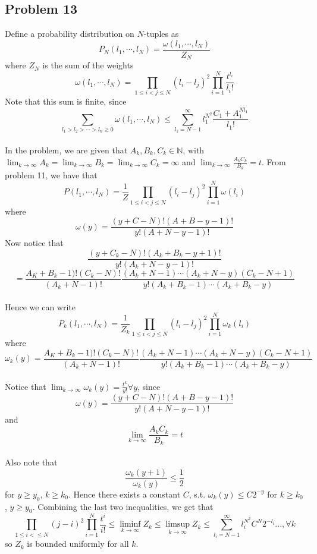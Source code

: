\documentclass[12pt]{article}
\begin{document}
	
	\subsection*{Problem 13}

Define a probability distribution on $N$-tuples as
$$P_N(l_1, \cdots, l_N) = \frac{\omega(l_1, \cdots, l_N)}{Z_N}$$
where $Z_N$ is the sum of the weights
$$\omega(l_1, \cdots, l_N) = \prod_{1 \leq i < j \leq N} (l_i - l_j)^2 \prod_{i = 1}^N \frac{t^{l_i}}{l_i !}$$
Note that this sum is finite, since
$$\sum_{l_1 > l_2 > \cdots > l_n \geq 0} \omega(l_1, \cdots, l_N) \leq \sum_{l_1 = N-1}^\infty l_1^{N^2} \frac{C_1 + A_1^{Nl_1}}{l_1!}$$\\

In the problem, we are given that $A_k, B_k, C_k \in \mathbb{N}$, with $\lim_{k \rightarrow \infty} A_k = \lim_{k \rightarrow \infty} B_k = \lim_{k \rightarrow \infty} C_k = \infty$ and $\lim_{k \rightarrow \infty} \frac{A_k C_k}{B_k} = t$. From problem 11, we have that
$$P(l_1, \cdots, l_N) = \frac{1}{Z} \prod_{1 \leq i < j \leq N} (l_i - l_j)^2 \prod_{i = 1}^N \omega(l_i)$$
where
$$\omega(y) = \frac{(y + C - N)!(A + B - y - 1)!}{y!(A + N - y - 1)!}$$
Now notice that
$$\frac{(y + C_k - N) ! (A_k + B_k - y + 1)!}{y! (A_k + N - y - 1)!}$$
$$= \frac{A_K + B_k - 1)! (C_k - N)!}{(A_k + N - 1)!} \frac{(A_k + N - 1) \cdots (A_k + N - y) (C_k - N + 1)}{y! (A_k + B_k - 1) \cdots (A_k + B_k - y)}$$\\

Hence we can write
$$P_k(l_1, \cdots, l_N) = \frac{1}{Z_k} \prod_{1 \leq i < j \leq N}(l_i - l_j)^2 \prod_{i = 1}^N \omega_k (l_i)$$
where
$$\omega_k(y) = \frac{A_K + B_k - 1)! (C_k - N)!}{(A_k + N - 1)!} \frac{(A_k + N - 1) \cdots (A_k + N - y) (C_k - N + 1)}{y! (A_k + B_k - 1) \cdots (A_k + B_k - y)}$$\\

Notice that $\lim_{k \rightarrow \infty} \omega_k(y) = \frac{t^k}{y!} \forall y$, since 
$$\omega(y) = \frac{(y + C - N)!(A + B - y - 1)!}{y!(A + N - y - 1)!}$$
and
$$\lim_{k \rightarrow \infty} \frac{A_k C_k}{B_k} = t$$\\

Also note that
$$\frac{\omega_k (y+1)}{\omega_k (y)} \leq \frac{1}{2}$$
for $y \geq y_0$, $k\geq k_0$. Hence there exists a constant $C$, s.t. $\omega_k(y) \leq C 2^{-y}$ for $k \geq k_0$, $y \geq y_0$. Combining the last two inequalities, we get that
$$\prod_{1 \leq i <  \leq N} (j - i)^2 \prod_{i = 1}^N \frac{t^i}{i !} \leq \liminf_{k \rightarrow \infty} Z_k \leq \limsup_{k \rightarrow \infty} Z_k \leq \sum_{l_i = N - 1}^\infty l_i^{N^2} C^N 2^{-l_i}..., \forall k$$
so $Z_k$ is bounded uniformly for all $k$.\\
\end{document}
